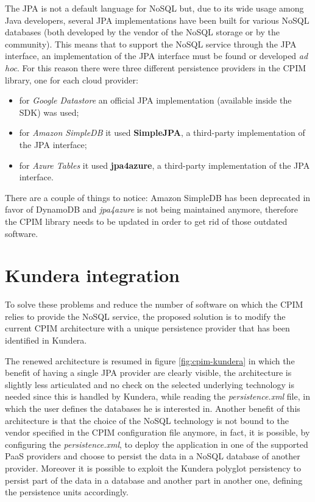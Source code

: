 \newparagraph The JPA is not a default language for NoSQL but, due to its wide usage among Java developers, several JPA implementations have been built for various NoSQL databases (both developed by the vendor of the NoSQL storage or by the community).
This means that to support the NoSQL service through the JPA interface, an implementation of the JPA interface must be found or developed \textit{ad hoc}. For this reason there were three different persistence providers in the CPIM library, one for each cloud provider:
\begin{itemize}
\item for \textit{Google Datastore} an official JPA implementation (available inside the SDK) was used;
\item for \textit{Amazon SimpleDB} it used \textbf{SimpleJPA}, a third-party implementation of the JPA interface;
\item for \textit{Azure Tables} it used \textbf{jpa4azure}, a third-party implementation of the JPA interface.
\end{itemize}

\noindent There are a couple of things to notice: Amazon SimpleDB has been deprecated in favor of DynamoDB and \textit{jpa4azure} is not being maintained anymore, therefore the CPIM library needs to be updated in order to get rid of those outdated software.

\section{Kundera integration}
\label{sec:kundera-integration}
To solve these problems and reduce the number of software on which the CPIM relies to provide the NoSQL service, the proposed solution is to modify the current CPIM architecture with a unique persistence provider that has been identified in Kundera.

\newparagraph The renewed architecture is resumed in figure \ref{fig:cpim-kundera} in which the benefit of having a single JPA provider are clearly visible, the architecture is slightly less articulated and no check on the selected underlying technology is needed since this is handled by Kundera, while reading the \textit{persistence.xml} file, in which the user defines the databases he is interested in.
Another benefit of this architecture is that the choice of the NoSQL technology is not bound to the vendor specified in the CPIM configuration file anymore, in fact, it is possible, by configuring the \textit{persistence.xml}, to deploy the application in one of the supported PaaS providers and choose to persist the data in a NoSQL database of another provider. Moreover it is possible to exploit the Kundera polyglot persistency to persist part of the data in a database and another part in another one, defining the persistence units accordingly.

